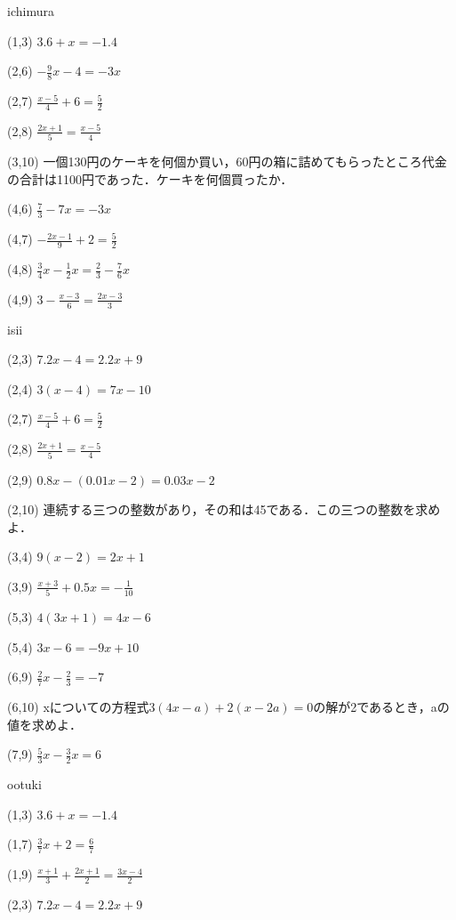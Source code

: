 \documentclass[a4paper,fleqn,papersize,15pt]{jsarticle}
\begin{document}
      ichimura

 (1,3)  \large     $3.6 + x = -1.4$

(2,6)  \large     $- \frac{9}{8}x -4 = -3x$

(2,7)  \large     $\frac{x-5}{4} + 6 = \frac{5}{2}$

(2,8)  \large     $\frac{2x+1}{5}  = \frac{x-5}{4}$

(3,10)  \large     一個130円のケーキを何個か買い，60円の箱に詰めてもらったところ代金の合計は1100円であった．ケーキを何個買ったか．

(4,6)  \large     $\frac{7}{3} -7x = -3x$

(4,7)  \large     $- \frac{2x-1}{9} + 2 = \frac{5}{2}$

(4,8)  \large     $\frac{3}{4}x-\frac{1}{2}x = \frac{2}{3}-\frac{7}{6}x$

(4,9)  \large     $ 3 - \frac{x-3}{6} = \frac{2x-3}{3}$

\clearpage
isii    

 (2,3)  \large     $7.2x -4 = 2.2x + 9$

(2,4)  \large     $3(x -4) = 7x -10$

(2,7)  \large     $\frac{x-5}{4} + 6 = \frac{5}{2}$

(2,8)  \large     $\frac{2x+1}{5}  = \frac{x-5}{4}$

(2,9)  \large     $0.8x-(0.01x-2) = 0.03x-2$

(2,10)  \large     連続する三つの整数があり，その和は45である．この三つの整数を求めよ．

(3,4)  \large     $9(x -2) = 2x + 1$

(3,9)  \large     $\frac{x+3}{5} +0.5x = -\frac{1}{10}$

(5,3)  \large     $4(3x + 1) = 4x -6$

(5,4)  \large     $3x -6 = -9x + 10$

(6,9)  \large     $\frac{2}{7}x - \frac{2}{3} = -7$

(6,10)  \large     xについての方程式$3(4x-a)+2(x-2a)=0$の解が2であるとき，aの値を求めよ．

(7,9)  \large     $\frac{5}{3}x - \frac{3}{2}x = 6$

\clearpage
ootuki  

 (1,3)  \large     $3.6 + x = -1.4$

(1,7)  \large     $\frac{3}{7}x + 2 = \frac{6}{7}$

(1,9)  \large     $\frac{x+1}{3} +\frac{2x+1}{2} = \frac{3x-4}{2}$

(2,3)  \large     $7.2x -4 = 2.2x + 9$
\end{document}
